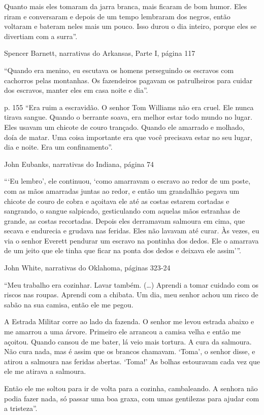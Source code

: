 Quanto mais eles tomaram da jarra branca, mais ficaram de bom humor.
Eles riram e conversaram e depois de um tempo lembraram dos negros,
então voltaram e bateram neles mais um pouco. Isso durou o dia inteiro,
porque eles se divertiam com a surra''.

Spencer Barnett, narrativas do Arkansas, Parte I, página 117

``Quando era menino, eu escutava os homens perseguindo os escravos com
cachorros pelas montanhas. Os fazendeiros pagavam os patrulheiros para
cuidar dos escravos, manter eles em casa noite e dia''.

p. 155 ``Era ruim a escravidão. O senhor Tom Williams não era cruel. Ele
nunca tirava sangue. Quando o berrante soava, era melhor estar todo
mundo no lugar. Eles usavam um chicote de couro trançado. Quando ele
amarrado e molhado, doía de matar. Uma coisa importante era que você
precisava estar no seu lugar, dia e noite. Era um confinamento''.

John Eubanks, narrativas do Indiana, página 74

```Eu lembro', ele continuou, `como amarravam o escravo ao redor de um
poste, com as mãos amarradas juntas ao redor, e então um grandalhão
pegava um chicote de couro de cobra e açoitava ele até as costas estarem
cortadas e sangrando, o sangue salpicado, gesticulando com aquelas mãos
estranhas de grande, as costas recortadas. Depois eles derramavam
salmoura em cima, que secava e endurecia e grudava nas feridas. Eles não
lavavam até curar. Às vezes, eu via o senhor Everett pendurar um escravo
na pontinha dos dedos. Ele o amarrava de um jeito que ele tinha que
ficar na ponta dos dedos e deixava ele assim'''.

John White, narrativas do Oklahoma, páginas 323-24

``Meu trabalho era cozinhar. Lavar também. (\ldots{}) Aprendi a tomar
cuidado com os riscos nas roupas. Aprendi com a chibata. Um dia, meu
senhor achou um risco de sabão na sua camisa, então ele me pegou.

A Estrada Militar corre ao lado da fazenda. O senhor me levou estrada
abaixo e me amarrou a uma árvore. Primeiro ele arrancou a camisa velha e
então me açoitou. Quando cansou de me bater, lá veio mais tortura. A
cura da salmoura. Não cura nada, mas é assim que os brancos chamavam.
`Toma', o senhor disse, e atirou a salmoura nas feridas abertas. `Toma!'
As bolhas estouravam cada vez que ele me atirava a salmoura.

Então ele me soltou para ir de volta para a cozinha, cambaleando. A
senhora não podia fazer nada, só passar uma boa graxa, com umas
gentilezas para ajudar com a tristeza''.

